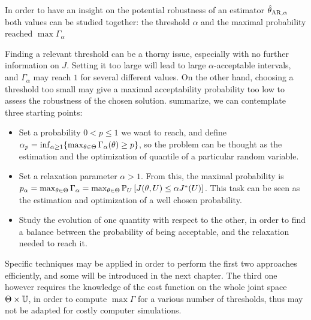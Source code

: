 \documentclass[../../Main_ManuscritThese.tex]{subfiles}
\begin{document}
  In order to have an insight on the potential robustness of an estimator $\hat{\theta}_{\mathrm{AR,\alpha}}$ both values can be studied together: the threshold $\alpha$ and the maximal probability reached $\max \Gamma_\alpha$

  
  Finding a relevant threshold can be a thorny issue, especially with no further information on $J$. Setting it too large will lead to large $\alpha$-acceptable intervals, and $\Gamma_\alpha$  may reach $1$ for several different values. On the other hand, choosing a threshold too small may give a maximal acceptability probability too low to assess the robustness of the chosen solution.
 summarize, we can contemplate three starting points:
\begin{itemize}
\item Set a probability $0< p\leq 1 $ we want to reach, and define $\alpha_p = \inf_{\alpha \geq 1}\{\max_{\theta \in \Theta}\Gamma_{\alpha}(\theta)\geq p \}$, so the problem can be thought as the estimation and the optimization of quantile of a particular random variable.
\item Set a relaxation parameter $\alpha > 1$. From this, the maximal probability is $p_{\alpha} = \max_{\theta\in\Theta} \Gamma_{\alpha} = \max_{\theta\in\Theta} \mathbb{P}_{U}\left[J(\theta, U) \leq \alpha J^*(U)\right]$. This task can be seen as the estimation and optimization of a well chosen probability.

\item Study the evolution of one quantity with respect to the other, in order to find a balance between the probability of being acceptable, and the relaxation needed to reach it.
\end{itemize}

Specific techniques may be applied in order to perform the first two approaches efficiently, and some will be introduced in the next chapter. The third one however requires the knowledge of the cost function on the whole joint space $\Theta \times \mathbb{U}$, in order to compute $\max \Gamma$ for a various number of thresholds, thus may not be adapted for costly computer simulations.
\end{document}
